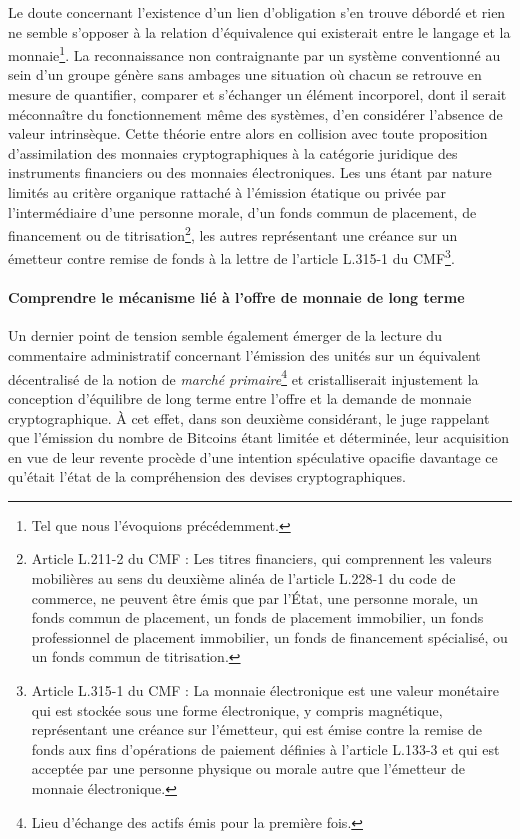 { Le doute concernant l'existence d'un lien d'obligation s'en trouve débordé et rien ne semble s'opposer à la relation d'équivalence qui existerait entre le langage et la monnaie\footnote{Tel que nous l'évoquions précédemment.}. La reconnaissance non contraignante par un système conventionné au sein d'un groupe génère sans ambages une situation où chacun se retrouve en mesure de quantifier, comparer et s'échanger un élément incorporel, dont il serait méconnaître du fonctionnement même des systèmes, d'en considérer l'absence de valeur intrinsèque. Cette théorie entre alors en collision avec toute proposition d'assimilation des monnaies cryptographiques à la catégorie juridique des instruments financiers ou des monnaies électroniques. Les uns étant par nature limités au critère organique rattaché à l'émission étatique ou privée par l'intermédiaire d'une personne morale, d'un fonds commun de placement, de financement ou de titrisation\footnote{Article L.211-2 du CMF : \og Les titres financiers, qui comprennent les valeurs mobilières au sens du deuxième alinéa de l'article L.228-1 du code de commerce, ne peuvent être émis que par l'État, une personne morale, un fonds commun de placement, un fonds de placement immobilier, un fonds professionnel de placement immobilier, un fonds de financement spécialisé, ou un fonds commun de titrisation\fg.}, les autres représentant une créance sur un émetteur contre remise de fonds à la lettre de l'article L.315-1 du CMF\footnote{Article L.315-1 du CMF : \og  La monnaie électronique est une valeur monétaire qui est stockée sous une forme électronique, y compris magnétique, représentant une créance sur l'émetteur, qui est émise contre la remise de fonds aux fins d'opérations de paiement définies à l'article L.133-3 et qui est acceptée par une personne physique ou morale autre que l'émetteur de monnaie électronique\fg{}.}.\par
 
 \paragraph{Comprendre le mécanisme lié à l'offre de monnaie de long terme}
 
 Un dernier point de tension semble également émerger de la lecture du commentaire administratif concernant l'émission des unités sur un équivalent décentralisé de la notion de \emph{marché primaire}\footnote{Lieu d'échange des actifs émis pour la première fois.} et cristalliserait injustement la conception d'équilibre de long terme entre l'offre et la demande de monnaie cryptographique. À cet effet, dans son deuxième considérant, le juge rappelant que \og l'émission du nombre de Bitcoins étant limitée et déterminée, leur acquisition en vue de leur revente procède d'une intention spéculative\fg{} opacifie davantage ce qu'était l'état de la compréhension des devises cryptographiques.\par
 
}
